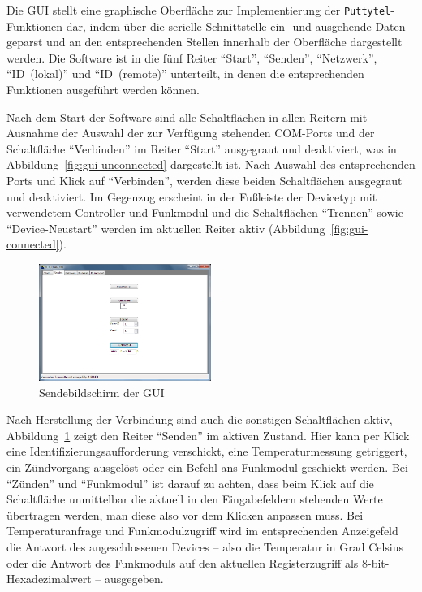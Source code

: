 \documentclass[pdftex, parskip, numbers=noenddot, toc=listof]{scrbook}
\begin{document}
	Die GUI stellt eine graphische Oberfläche zur Implementierung der \texttt{Puttytel}-Funktionen dar, indem über die serielle Schnittstelle ein- und ausgehende Daten geparst und an den entsprechenden Stellen innerhalb der Oberfläche dargestellt werden. Die Software ist in die fünf Reiter \enquote{Start}, \enquote{Senden}, \enquote{Netzwerk}, \enquote{ID~(lokal)} und \enquote{ID~(remote)} unterteilt, in denen die entsprechenden Funktionen ausgeführt werden können.

	Nach dem Start der Software sind alle Schaltflächen in allen Reitern mit Ausnahme der Auswahl der zur Verfügung stehenden COM-Ports und der Schaltfläche \enquote{Verbinden} im Reiter \enquote{Start} ausgegraut und deaktiviert, was in Abbildung~\ref{fig:gui-unconnected} dargestellt ist. Nach Auswahl des entsprechenden Ports und Klick auf \enquote{Verbinden}, werden diese beiden Schaltflächen ausgegraut und deaktiviert. Im Gegenzug erscheint in der Fußleiste der Devicetyp mit verwendetem Controller und Funkmodul und die Schaltflächen \enquote{Trennen} sowie \enquote{Device-Neustart} werden im aktuellen Reiter aktiv (Abbildung~\ref{fig:gui-connected}).%
	\begin{figure}[!b]
		\centering
		\includegraphics[width=0.5\textwidth]{bilder/gui-senden}
		\caption{Sendebildschirm der GUI}
		\label{fig:gui-senden}
	\end{figure}

	Nach Herstellung der Verbindung sind auch die sonstigen Schaltflächen aktiv, Abbildung~\ref{fig:gui-senden} zeigt den Reiter \enquote{Senden} im aktiven Zustand. Hier kann per Klick eine Identifizierungsaufforderung verschickt, eine Temperaturmessung getriggert, ein Zündvorgang ausgelöst oder ein Befehl ans Funkmodul geschickt werden. Bei \enquote{Zünden} und \enquote{Funkmodul} ist darauf zu achten, dass beim Klick auf die Schaltfläche unmittelbar die aktuell in den Eingabefeldern stehenden Werte übertragen werden, man diese also vor dem Klicken anpassen muss. Bei Temperaturanfrage und Funkmodulzugriff wird im entsprechenden Anzeigefeld die Antwort des angeschlossenen Devices -- also die Temperatur in Grad Celsius oder die Antwort des Funkmoduls auf den aktuellen Registerzugriff als 8-bit-Hexadezimalwert -- ausgegeben.
\end{document}
